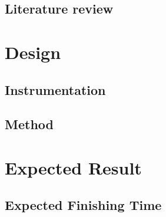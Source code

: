 \documentclass{article}
\begin{document}
\subsection{Literature review} 

\section{Design}
\subsection{Instrumentation}
\subsection{Method}

\section{Expected Result}
\subsection{Expected Finishing Time}



\end{document}
